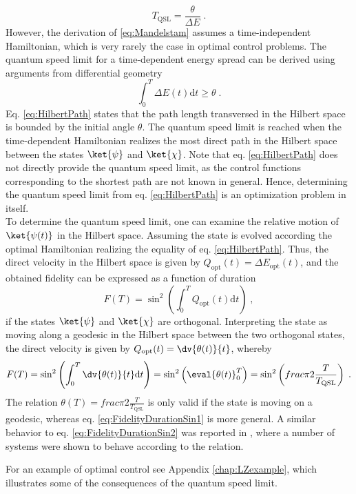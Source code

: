 \begin{equation}
	T_{\mathrm{QSL}} = \frac{\theta}{\Delta E} \; . \label{eq:Mandelstam}
\end{equation}
However, the derivation of \eqref{eq:Mandelstam} assumes a time-independent Hamiltonian, which is very rarely the case in optimal control problems. The quantum speed limit for a time-dependent energy spread can be derived using arguments from differential geometry \cite{Aharonov,beyondQSL}
\begin{equation}
	\int_{0}^{T} \Delta E(t) \mathrm{d}t \geq \theta \; . \label{eq:HilbertPath}
\end{equation}
Eq. \eqref{eq:HilbertPath} states that the path length transversed in the Hilbert space is bounded by the initial angle $\theta$. The quantum speed limit is reached when the time-dependent Hamiltonian realizes the most direct path in the Hilbert space between the states $\ket{\psi}$ and $\ket{\chi}$. Note that eq. \eqref{eq:HilbertPath} does not directly provide the quantum speed limit, as the control functions corresponding to the shortest path are not known in general. Hence, determining the quantum speed limit from eq. \eqref{eq:HilbertPath} is an optimization problem in itself.\\

To determine the quantum speed limit, one can examine the relative motion of $\ket{\psi (t)}$ in the Hilbert space. Assuming the state is evolved according the optimal Hamiltonian realizing the equality of eq. \eqref{eq:HilbertPath}. Thus, the direct velocity in the Hilbert space is given by $Q_{\mathrm{opt}} (t) = \Delta E_{\mathrm{opt}}(t)$, and the obtained fidelity can be expressed as a function of duration \cite{beyondQSL}
\begin{equation}
	F(T) = \sin ^2 \left( \int_{0}^{T} Q_{\mathrm{opt}} (t) \mathrm{d} t \right) \; ,
	\label{eq:FidelityDurationSin1}
\end{equation}  
if the states $\ket{\psi}$ and $\ket{\chi}$ are orthogonal. Interpreting the state as moving along a geodesic in the Hilbert space between the two orthogonal states, the direct velocity is given by $Q_{\mathrm{opt}} (t) = \dv{\theta (t)}{t}$, whereby
\begin{equation}
	F(T) = \sin ^2 \left( \int_{0}^{T} \dv{\theta (t)}{t} \mathrm{d} t \right) =  \sin ^2 \left( \eval{\theta(t)}_{0}^{T} \right) = \sin ^2 \left( frac{\pi}{2} \frac{T}{T_{\mathrm{QSL}}} \right) \; .
	\label{eq:FidelityDurationSin2}
\end{equation}  
The relation $\theta (T) = frac{\pi}{2} \frac{T}{T_{\mathrm{QSL}}}$ is only valid if the state is moving on a geodesic, whereas eq. \eqref{eq:FidelityDurationSin1} is more general. A similar behavior to eq. \eqref{eq:FidelityDurationSin2} was reported in \cite{Caneva2011}, where a number of systems were shown to behave according to the relation.

For an example of optimal control see Appendix \ref{chap:LZexample}, which illustrates some of the consequences of the quantum speed limit.